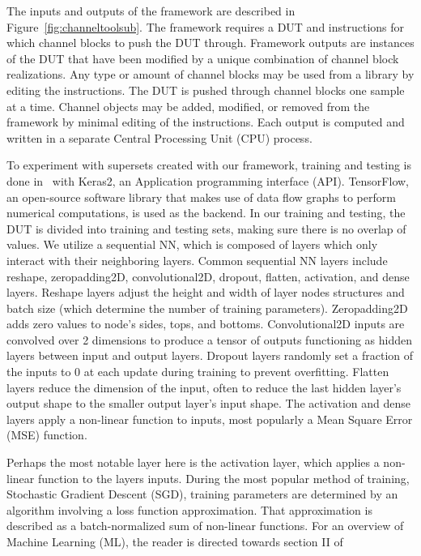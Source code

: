 The inputs and outputs of the framework are described in Figure~\ref{fig:channeltoolsub}. The framework requires a DUT and instructions for which channel blocks to push the DUT through. Framework outputs are instances of the DUT that have been modified by a unique combination of channel block realizations. Any type or amount of channel blocks may be used from a library by editing the instructions. The DUT is pushed through channel blocks one sample at a time. Channel objects may be added, modified, or removed from the framework by minimal editing of the instructions. Each output is computed and written in a separate Central Processing Unit (CPU) process.

To experiment with supersets created with our framework, training and testing is done in~\cite{convnetmodrec} with Keras2, an Application programming interface (API). TensorFlow, an open-source software library that makes use of data flow graphs to perform numerical computations, is used as the backend. In our training and testing, the DUT is divided into training and testing sets, making sure there is no overlap of values. We utilize a sequential NN, which is composed of layers which only interact with their neighboring layers. Common sequential NN layers include reshape, zeropadding2D, convolutional2D, dropout, flatten, activation, and dense layers. Reshape layers adjust the height and width of layer nodes structures and batch size (which determine the number of training parameters). Zeropadding2D adds zero values to node's sides, tops, and bottoms. Convolutional2D inputs are convolved over 2 dimensions to produce a tensor of outputs functioning as hidden layers between input and output layers. Dropout layers randomly set a fraction of the inputs to 0 at each update during training to prevent overfitting. Flatten layers reduce the dimension of the input, often to reduce the last hidden layer's output shape to the smaller output layer's input shape. The activation and dense layers apply a non-linear function to inputs, most popularly a Mean Square Error (MSE) function.

Perhaps the most notable layer here is the activation layer, which applies a non-linear function to the layers inputs. During the most popular method of training, Stochastic Gradient Descent (SGD), training parameters are determined by an algorithm involving a loss function approximation. That approximation is described as a batch-normalized sum of non-linear functions. For an overview of Machine Learning (ML), the reader is directed towards section II of~\cite{8054694}

